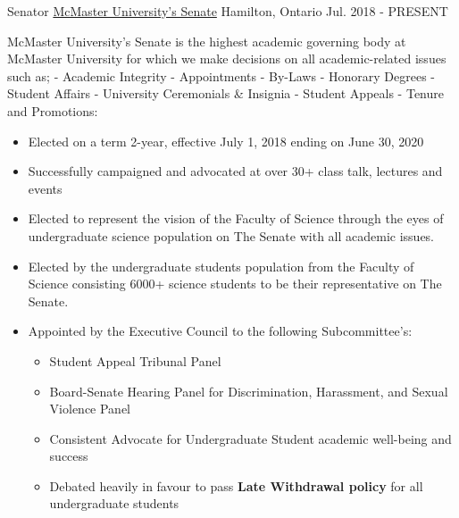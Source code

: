 

\begin{cventries}

  \cventry
    {Senator} %
    {\href{https://secretariat.mcmaster.ca/senate/}{McMaster University's Senate}} %
    {Hamilton, Ontario} %
    {Jul. 2018 - PRESENT} %
     {\renewcommand{\labelitemii}{\bullet}
      \begin{cvitems}%
        \item[] {McMaster University's Senate is the highest academic governing body at McMaster University for which we make decisions on all academic-related issues such as;  - Academic Integrity - Appointments - By-Laws - Honorary Degrees - Student Affairs - University Ceremonials \& Insignia - Student Appeals - Tenure and Promotions:}
        \begin{itemize} 
        \item {Elected on a term 2-year, effective July 1, 2018 ending on June 30, 2020}
        \item{Successfully campaigned and advocated at over 30+ class talk, lectures and events}
        \item {Elected to represent the vision of the Faculty of Science through the eyes of undergraduate science population on The Senate with all academic issues.}
        \item{Elected by the undergraduate students population from the Faculty of Science consisting 6000+ science students to be their representative on The Senate.}
        \item{Appointed by the Executive Council to the following Subcommittee's:}
        \begin{itemize}
            \item {Student Appeal Tribunal Panel}
            \item {Board-Senate Hearing Panel for Discrimination, Harassment, and Sexual Violence Panel}
            \item {Consistent Advocate for Undergraduate Student academic well-being and success}
            \item {Debated heavily in favour to pass \textbf{Late Withdrawal policy} for all undergraduate students}
        \end{itemize}
        \end{itemize}
      \end{cvitems}
    }


\end{cventries}
